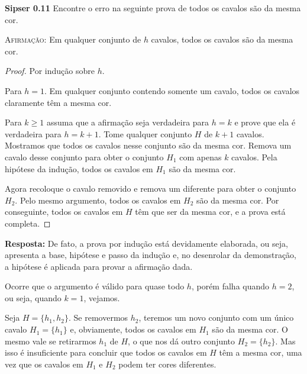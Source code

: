 
\noindent \textbf{Sipser 0.11} Encontre o erro na seguinte prova de todos os cavalos são da mesma cor.


\textsc{Afirmação:} Em qualquer conjunto de $h$ cavalos, todos os cavalos são da mesma cor.

\begin{proof} Por indução sobre $h$.

\indbase Para $h = 1$. Em qualquer conjunto contendo somente um cavalo, todos os cavalos claramente têm a mesma cor.

\indstep Para $k \geq 1$ assuma que a afirmação seja verdadeira para $h = k$ e prove que ela é verdadeira para $h = k + 1$. Tome qualquer conjunto $H$ de $k + 1$ cavalos. Mostramos que todos os cavalos nesse conjunto são da mesma cor. Remova um cavalo desse conjunto para obter o conjunto $H_1$ com apenas $k$ cavalos. Pela hipótese da indução, todos os cavalos em $H_1$ são da mesma cor.

Agora recoloque o cavalo removido e remova um diferente para obter o conjunto $H_2$. Pelo mesmo argumento, todos os cavalos em $H_2$ são da mesma cor. Por conseguinte, todos os cavalos em $H$ têm que ser da mesma cor, e a prova está
completa.
\end{proof}

\textbf{Resposta:} De fato, a prova por indução está devidamente elaborada, ou seja, apresenta a base, hipótese e passo da indução e, no desenrolar da demonstração, a hipótese é aplicada para provar a afirmação dada.

Ocorre que o argumento é válido para quase todo $h$, porém falha quando $h = 2$, ou seja, quando $k = 1$, vejamos.

Seja $H = \{h_1, h_2\}$. Se removermos $h_2$, teremos um novo conjunto com um único cavalo $H_1 = \{h_1\}$ e, obviamente, todos os cavalos em $H_1$ são da mesma cor. O mesmo vale se retirarmos $h_1$ de $H$, o que nos dá outro conjunto $H_2 = \{h_2\}$. Mas isso é insuficiente para concluir que todos os cavalos em $H$ têm a mesma cor, uma vez que os cavalos em $H_1$ e $H_2$ podem ter cores diferentes.\\[6pt]
